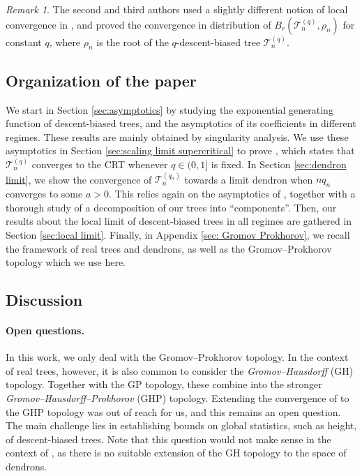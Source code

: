 \documentclass{article}
\theoremstyle{remark}
\newtheorem{remark}{Remark}
\newcommand{\cT}{\mathcal{T}}
\begin{document}
\begin{remark}
\label{rk:root local limit}
    The second and third authors used a slightly different notion of local convergence in \cite{Thevenin_Wagner_2023}, and proved the convergence in distribution of $B_r(\cT_n^{(q)}, \rho_n)$ for constant $q$, where $\rho_n$ is the root of the $q$-descent-biased tree $\cT_n^{(q)}$.
\end{remark}


\subsection{Organization of the paper}
\label{sec: Organization of the paper and proof strategy}

We start in Section \ref{sec:asymptotics} by studying the exponential generating function of descent-biased trees, and the asymptotics of its coefficients in different regimes. 
These results are mainly obtained by singularity analysis.
We use these asymptotics in Section \ref{sec:scaling limit supercritical} to prove , which states that $\cT_n^{(q)}$ converges to the CRT whenever $q \in (0,1]$ is fixed.
In Section \ref{sec:dendron limit}, we show the convergence of $\cT_n^{(q_n)}$ towards a limit dendron when $nq_n$ converges to some $a>0$.
This relies again on the asymptotics of , together with a thorough study of a decomposition of our trees into ``components''.
Then, our results about the local limit of descent-biased trees in all regimes are gathered in Section \ref{sec:local limit}.
Finally, in Appendix \ref{sec: Gromov Prokhorov}, we recall the framework of real trees and dendrons, as well as the Gromov--Prokhorov topology which we use here. 


\subsection{Discussion}
\label{sec: Discussion}

\paragraph{Open questions.}
In this work, we only deal with the Gromov--Prokhorov topology.
In the context of real trees, however, it is also common to consider the \emph{Gromov--Hausdorff} (GH) topology.
Together with the GP topology, these combine into the stronger \emph{Gromov--Hausdorff--Prokhorov} (GHP) topology.
Extending the convergence of  to the GHP topology was out of reach for us, and this remains an open question.
The main challenge lies in establishing bounds on global statistics, such as height, of descent-biased trees.
Note that this question would not make sense in the context of , as there is no suitable extension of the GH topology to the space of dendrons.
\end{document}
